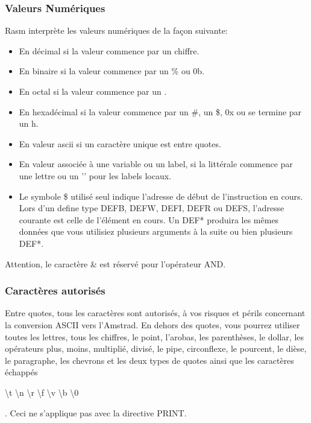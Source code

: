\begin{xfr}

\subsubsection{Valeurs Numériques}

Rasm interprète les valeurs numériques de la façon suivante:

\begin{itemize}
  \item En décimal si la valeur commence par un chiffre.
  \item En binaire si la valeur commence par un \% ou 0b.
  \item En octal si la valeur commence par un \at.
  \item En hexadécimal si la valeur commence par un \#, un \$, 0x ou se termine par un h.
  \item En valeur ascii si un caractère unique est entre quotes. %
  \item En valeur associée à une variable ou un label, si la littérale commence par une lettre ou un '\at' pour les labels locaux.
  \item Le symbole \$ utilisé seul indique l'adresse de début de l'instruction en cours. Lors d'un define type DEFB, DEFW, DEFI, DEFR ou DEFS, l'adresse courante est celle de l'élément en cours. Un DEF* produira les mêmes données que vous utilisiez plusieurs arguments à la suite ou bien plusieurs DEF*.
\end{itemize}

Attention, le caractère \& est réservé pour l'opérateur AND.

\subsubsection{Caractères autorisés}
Entre quotes, tous les caractères sont autorisés, à vos risques et périls concernant la conversion ASCII vers l'Amstrad. En dehors des quotes, vous pourrez utiliser toutes les lettres, tous les chiffres, le point, l'arobas, les parenthèses, le dollar, les opérateurs plus, moins, multiplié, divisé, le pipe, circonflexe, le pourcent, le dièse, le paragraphe, les chevrons et les deux types de quotes ainsi que les caractères échappés \begin{ttfamily} \textbackslash t \textbackslash n  \textbackslash r \textbackslash f \textbackslash v \textbackslash b \textbackslash 0 \end{ttfamily}.
Ceci ne s'applique pas avec la directive PRINT. %
\end{xfr}


